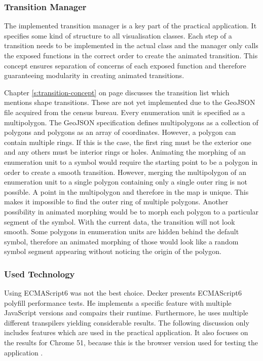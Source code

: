\subsubsection{Transition Manager}
The implemented transition manager is a key part of the practical application. It specifies some kind of structure to all visualisation classes. Each step of a transition needs to be implemented in the actual class and the manager only calls the exposed functions in the correct order to create the animated transition. This concept ensures separation of concerns of each exposed function and therefore guaranteeing modularity in creating animated transitions.

Chapter \ref{s:transition-concept} on page \pageref{s:transition-concept} discusses the transition list which mentions shape transitions. These are not yet implemented due to the GeoJSON file acquired from the census bureau. Every enumeration unit is specified as a multipolygon. The GeoJSON specification defines multipolygons as a collection of polygons and polygons as an array of coordinates. However, a polygon can contain multiple rings. If this is the case, the first ring must be the exterior one and any others must be interior rings or holes.
Animating the morphing of an enumeration unit to a symbol would require the starting point to be a polygon in order to create a smooth transition. However, merging the multipolygon of an enumeration unit to a single polygon containing only a single outer ring is not possible. A point in the multipolygon and therefore in the map is unique. This makes it impossible to find the outer ring of multiple polygons.
Another possibility in animated morphing would be to morph each polygon to a particular segment of the symbol. With the current data, the transition will not look smooth. Some polygons in enumeration units are hidden behind the default symbol, therefore an animated morphing of those would look like a random symbol segment appearing without noticing the origin of the polygon.


\subsubsection{Used Technology}
Using ECMAScript6 was not the best choice. Decker presents ECMAScript6 polyfill performance tests. He implements a specific feature with multiple JavaScript versions and compairs their runtime. Furthermore, he uses multiple different transpilers yielding considerable results. The following discussion only includes features which are used in the practical application. It also focuses on the results for Chrome 51, because this is the browser version used for testing the application .

